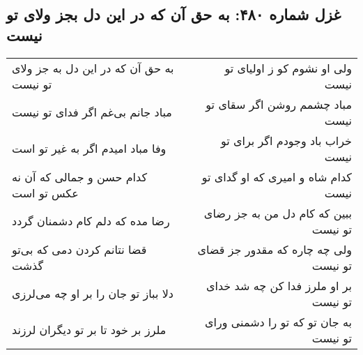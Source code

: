 \begin{center}
\section*{غزل شماره ۴۸۰: به حق آن که در این دل بجز ولای تو نیست}
\label{sec:0480}
\begin{longtable}{l p{0.5cm} r}
به حق آن که در این دل به جز ولای تو نیست
&&
ولی او نشوم کو ز اولیای تو نیست
\\
مباد جانم بی‌غم اگر فدای تو نیست
&&
مباد چشمم روشن اگر سقای تو نیست
\\
وفا مباد امیدم اگر به غیر تو است
&&
خراب باد وجودم اگر برای تو نیست
\\
کدام حسن و جمالی که آن نه عکس تو است
&&
کدام شاه و امیری که او گدای تو نیست
\\
رضا مده که دلم کام دشمنان گردد
&&
ببین که کام دل من به جز رضای تو نیست
\\
قضا نتانم کردن دمی که بی‌تو گذشت
&&
ولی چه چاره که مقدور جز قضای تو نیست
\\
دلا بباز تو جان را بر او چه می‌لرزی
&&
بر او ملرز فدا کن چه شد خدای تو نیست
\\
ملرز بر خود تا بر تو دیگران لرزند
&&
به جان تو که تو را دشمنی ورای تو نیست
\\
\end{longtable}
\end{center}
